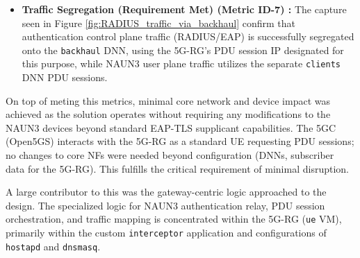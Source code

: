 \begin{itemize}
    \item \textbf{Traffic Segregation (Requirement Met) (Metric ID-7) :} The capture seen in Figure \ref{fig:RADIUS_traffic_via_backhaul} confirm that authentication control plane traffic (\ac{RADIUS}/\ac{EAP}) is successfully segregated onto the \texttt{backhaul} \ac{DNN}, using the \ac{5G-RG}'s \ac{PDU} session \ac{IP} designated for this purpose, while \ac{NAUN3} user plane traffic utilizes the separate \texttt{clients} \ac{DNN} \ac{PDU} sessions.
\end{itemize}

On top of meting this metrics, minimal core network and device impact was achieved as the solution operates without requiring any modifications to the \ac{NAUN3} devices beyond standard \ac{EAP-TLS} supplicant capabilities. The \ac{5GC} (Open5GS) interacts with the \ac{5G-RG} as a standard \ac{UE} requesting \ac{PDU} sessions; no changes to core \acp{NF} were needed beyond configuration (\acp{DNN}, subscriber data for the \ac{5G-RG}). This fulfills the critical requirement of minimal disruption.

A large contributor to this was the gateway-centric logic approached to the design. The specialized logic for \ac{NAUN3} authentication relay, \ac{PDU} session orchestration, and traffic mapping is concentrated within the \ac{5G-RG} (\texttt{ue} \ac{VM}), primarily within the custom \texttt{interceptor} application and configurations of \texttt{hostapd} and \texttt{dnsmasq}.